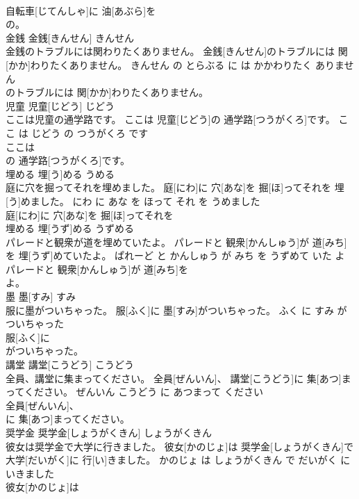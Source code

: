 \documentclass[8pt]{extreport}
\begin{document}
\begin{CJK}{UTF8}{min}
\\	自転車[じてんしゃ]に 油[あぶら]を
\\	の。			
\\	金銭	金銭[きんせん]	きんせん	
\\	金銭のトラブルには関わりたくありません。	金銭[きんせん]のトラブルには 関[かか]わりたくありません。	きんせん の とらぶる に は かかわりたく ありません	
\\	のトラブルには 関[かか]わりたくありません。			
\\	児童	児童[じどう]	じどう	
\\	ここは児童の通学路です。	ここは 児童[じどう]の 通学路[つうがくろ]です。	ここ は じどう の つうがくろ です	
\\	ここは
\\	の 通学路[つうがくろ]です。			
\\	埋める	埋[う]める	うめる	
\\	庭に穴を掘ってそれを埋めました。	庭[にわ]に 穴[あな]を 掘[ほ]ってそれを 埋[う]めました。	にわ に あな を ほって それ を うめました	
\\	庭[にわ]に 穴[あな]を 掘[ほ]ってそれを
\\	埋める	埋[うず]める	うずめる	
\\	パレードと観衆が道を埋めていたよ。	パレードと 観衆[かんしゅう]が 道[みち]を 埋[うず]めていたよ。	ぱれーど と かんしゅう が みち を うずめて いた よ	
\\	パレードと 観衆[かんしゅう]が 道[みち]を
\\	よ。			
\\	墨	墨[すみ]	すみ	
\\	服に墨がついちゃった。	服[ふく]に 墨[すみ]がついちゃった。	ふく に すみ が ついちゃった	
\\	服[ふく]に
\\	がついちゃった。			
\\	講堂	講堂[こうどう]	こうどう	
\\	全員、講堂に集まってください。	全員[ぜんいん]、 講堂[こうどう]に 集[あつ]まってください。	ぜんいん こうどう に あつまって ください	
\\	全員[ぜんいん]、
\\	に 集[あつ]まってください。			
\\	奨学金	奨学金[しょうがくきん]	しょうがくきん	
\\	彼女は奨学金で大学に行きました。	彼女[かのじょ]は 奨学金[しょうがくきん]で 大学[だいがく]に 行[い]きました。	かのじょ は しょうがくきん で だいがく に いきました	
\\	彼女[かのじょ]は

\end{CJK}
\end{document}
